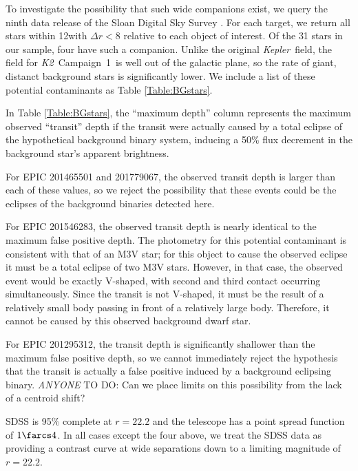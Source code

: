 \documentclass{emulateapj}
\newcommand{\project}[1]{\textsl{#1}}
\newcommand{\kep}{\project{Kepler}}
\newcommand{\KT}{\project{K2}}
\newcommand{\Ci}{Campaign~1}
\newcommand{\todo}[3]{{\color{#2} \emph{#1} TO DO: #3}}
\newcommand{\anytodo}[1]{\todo{ANYONE}{NavyBlue}{#1}}
\begin{document}
To investigate the possibility that such wide companions exist,
we query the ninth data release of the Sloan Digital Sky Survey 
\citep[SDSS DR9,][]{Ahn12}. 
For each target, we return
all stars within 12\arcsec with $\Delta r < 8$ relative to each object
of interest.
Of the 31 stars in our sample, four have such a companion.
Unlike the original \kep\ field, the field for \KT\ \Ci\ is 
well out of the galactic plane, so the rate of giant, distanct background
stars is significantly lower.
We include a list of these potential contaminants as Table 
\ref{Table:BGstars}.


In Table \ref{Table:BGstars}, the ``maximum depth'' column represents
the maximum observed ``transit'' depth if the transit were actually caused
by a total eclipse of the hypothetical background binary system, inducing
a 50\% flux decrement in the background star's apparent brightness.

For EPIC 201465501 and 201779067, the observed transit depth is 
larger than each of these values, so we reject the possibility that
these events could be the eclipses of the background binaries detected
here. 

For EPIC 201546283, the observed transit depth is nearly identical to 
the maximum false positive depth. 
The photometry for this potential contaminant is consistent with that
of an M3V star; for this object to cause the observed eclipse it must
be a total eclipse of two M3V stars. 
However, in that case, the observed event would be exactly V-shaped,
with second and third contact occurring simultaneously. 
Since the transit is not V-shaped, it must be the result of
a relatively small body passing in front of a relatively large body. 
Therefore, it cannot be caused by this observed background dwarf star.

For EPIC 201295312, the transit depth is significantly shallower than
the maximum false positive depth, so we cannot immediately
reject the hypothesis that the transit is actually a false positive 
induced by a background eclipsing binary. \anytodo{Can we place limits
on this possibility from the lack of a centroid shift?}

SDSS is 95\% complete at $r=22.2$ and the telescope has a point
spread function of $1\farcs4$. In all cases except the four above, we 
treat the SDSS data as providing a contrast curve at wide separations
down to a limiting magnitude of $r=22.2$.
\end{document}
